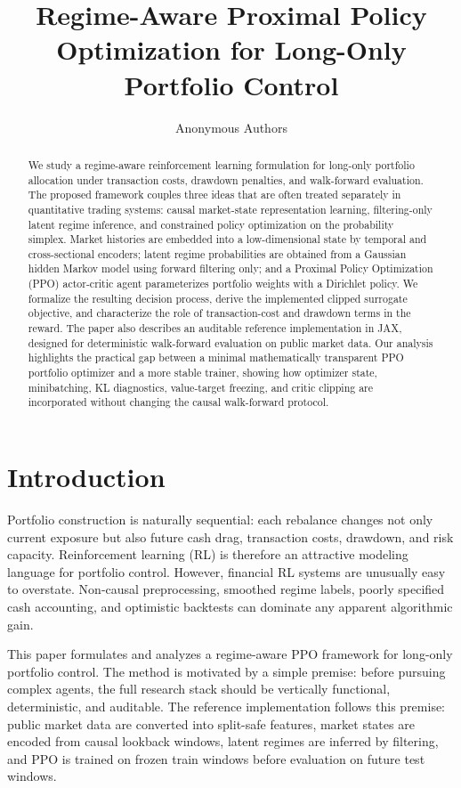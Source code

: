 \documentclass[11pt]{article}
\title{Regime-Aware Proximal Policy Optimization for Long-Only Portfolio Control}
\author{Anonymous Authors}
\date{}
\newcommand{\1}{\mathbf{1}}
\begin{document}
\maketitle

\begin{abstract}
We study a regime-aware reinforcement learning formulation for long-only
portfolio allocation under transaction costs, drawdown penalties, and
walk-forward evaluation. The proposed framework couples three ideas that are
often treated separately in quantitative trading systems: causal market-state
representation learning, filtering-only latent regime inference, and constrained
policy optimization on the probability simplex. Market histories are embedded
into a low-dimensional state by temporal and cross-sectional encoders; latent
regime probabilities are obtained from a Gaussian hidden Markov model using
forward filtering only; and a Proximal Policy Optimization (PPO) actor-critic
agent parameterizes portfolio weights with a Dirichlet policy. We formalize the
resulting decision process, derive the implemented clipped surrogate objective,
and characterize the role of transaction-cost and drawdown terms in the reward.
The paper also describes an auditable reference implementation in JAX, designed
for deterministic walk-forward evaluation on public market data. Our analysis
highlights the practical gap between a minimal mathematically transparent PPO
portfolio optimizer and a more stable trainer, showing how optimizer state,
minibatching, KL diagnostics, value-target freezing, and critic clipping are
incorporated without changing the causal walk-forward protocol.
\end{abstract}

\section{Introduction}

Portfolio construction is naturally sequential: each rebalance changes not only
current exposure but also future cash drag, transaction costs, drawdown, and
risk capacity. Reinforcement learning (RL) is therefore an attractive modeling
language for portfolio control. However, financial RL systems are unusually easy
to overstate. Non-causal preprocessing, smoothed regime labels, poorly specified
cash accounting, and optimistic backtests can dominate any apparent algorithmic
gain.

This paper formulates and analyzes a regime-aware PPO framework for long-only
portfolio control. The method is motivated by a simple premise: before pursuing
complex agents, the full research stack should be vertically functional,
deterministic, and auditable. The reference implementation follows this premise:
public market data are converted into split-safe features, market states are
encoded from causal lookback windows, latent regimes are inferred by filtering,
and PPO is trained on frozen train windows before evaluation on future test
windows.
\end{document}
